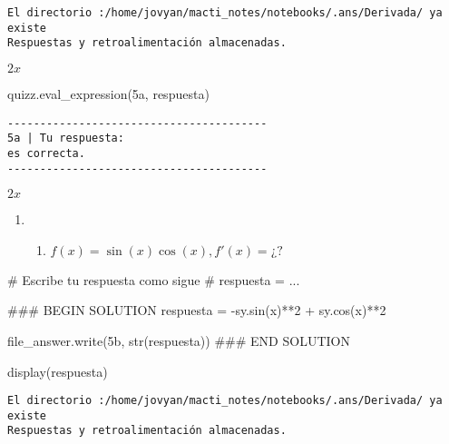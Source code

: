 \documentclass[
  letterpaper,
  DIV=11,
  numbers=noendperiod]{scrreprt}
\newenvironment{Shaded}{\begin{snugshade}}{\end{snugshade}}
\newcommand{\BuiltInTok}[1]{\textcolor[rgb]{0.00,0.23,0.31}{#1}}
\newcommand{\CommentTok}[1]{\textcolor[rgb]{0.37,0.37,0.37}{#1}}
\newcommand{\DecValTok}[1]{\textcolor[rgb]{0.68,0.00,0.00}{#1}}
\newcommand{\NormalTok}[1]{\textcolor[rgb]{0.00,0.23,0.31}{#1}}
\newcommand{\OperatorTok}[1]{\textcolor[rgb]{0.37,0.37,0.37}{#1}}
\newcommand{\RegionMarkerTok}[1]{\textcolor[rgb]{0.00,0.23,0.31}{#1}}
\newcommand{\StringTok}[1]{\textcolor[rgb]{0.13,0.47,0.30}{#1}}
\providecommand{\tightlist}{%
  \setlength{\itemsep}{0pt}\setlength{\parskip}{0pt}}\usepackage{longtable,booktabs,array}
\begin{document}
\begin{verbatim}
El directorio :/home/jovyan/macti_notes/notebooks/.ans/Derivada/ ya existe
Respuestas y retroalimentación almacenadas.
\end{verbatim}

$\displaystyle 2 x$

\begin{Shaded}
\begin{Highlighting}[]
\NormalTok{quizz.eval\_expression(}\StringTok{\textquotesingle{}5a\textquotesingle{}}\NormalTok{, respuesta)}
\end{Highlighting}
\end{Shaded}

\begin{verbatim}
----------------------------------------
5a | Tu respuesta:
es correcta.
----------------------------------------
\end{verbatim}

$\displaystyle 2 x$

\begin{enumerate}
\def\labelenumi{\arabic{enumi}.}
\setcounter{enumi}{4}
\tightlist
\item
  \begin{enumerate}
  \def\labelenumii{\alph{enumii}.}
  \setcounter{enumii}{1}
  \tightlist
  \item
    \(f(x) = \sin(x)\cos(x), f'(x) = ¿?\)
  \end{enumerate}
\end{enumerate}

\begin{Shaded}
\begin{Highlighting}[]
\CommentTok{\# Escribe tu respuesta como sigue }
\CommentTok{\# respuesta = ...}

\CommentTok{\#\#\# }\RegionMarkerTok{BEGIN}\CommentTok{ SOLUTION}
\NormalTok{respuesta }\OperatorTok{=} \OperatorTok{{-}}\NormalTok{sy.sin(x)}\OperatorTok{**}\DecValTok{2} \OperatorTok{+}\NormalTok{ sy.cos(x)}\OperatorTok{**}\DecValTok{2}

\NormalTok{file\_answer.write(}\StringTok{\textquotesingle{}5b\textquotesingle{}}\NormalTok{, }\BuiltInTok{str}\NormalTok{(respuesta))}
\CommentTok{\#\#\# }\RegionMarkerTok{END}\CommentTok{ SOLUTION}

\NormalTok{display(respuesta)}
\end{Highlighting}
\end{Shaded}

\begin{verbatim}
El directorio :/home/jovyan/macti_notes/notebooks/.ans/Derivada/ ya existe
Respuestas y retroalimentación almacenadas.
\end{verbatim}
\end{document}
